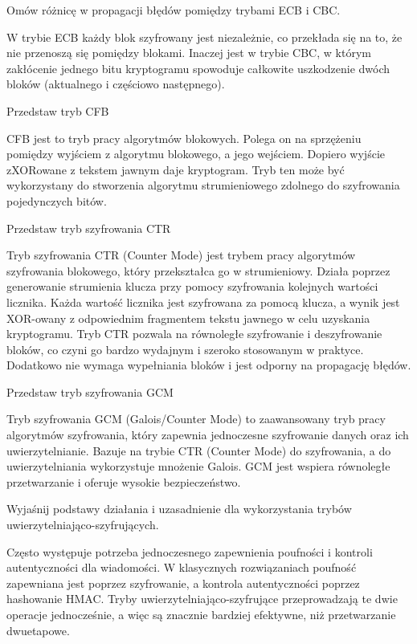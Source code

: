 \documentclass[answers,11pt]{exam}
\begin{document}
\begin{questions}
\question Omów różnicę w propagacji błędów pomiędzy trybami ECB i CBC.
\begin{solution}
W trybie ECB każdy blok szyfrowany jest niezależnie, co przekłada się na to, że nie przenoszą się pomiędzy blokami. Inaczej jest w trybie CBC, w którym zakłócenie jednego bitu kryptogramu spowoduje całkowite uszkodzenie dwóch bloków (aktualnego i częściowo następnego). 
\end{solution}

\question Przedstaw tryb CFB
\begin{solution}
CFB jest to tryb pracy algorytmów blokowych. Polega on na sprzężeniu pomiędzy wyjściem z algorytmu blokowego, a jego wejściem. Dopiero wyjście zXORowane z tekstem jawnym daje kryptogram.
Tryb ten może być wykorzystany do stworzenia algorytmu strumieniowego zdolnego do szyfrowania pojedynczych bitów. 
\end{solution}

\question Przedstaw tryb szyfrowania CTR 
\begin{solution} 
Tryb szyfrowania CTR (Counter Mode) jest trybem pracy algorytmów szyfrowania blokowego, który przekształca go w strumieniowy. Działa poprzez generowanie strumienia klucza przy pomocy szyfrowania kolejnych wartości licznika. Każda wartość licznika jest szyfrowana za pomocą klucza, a wynik jest XOR-owany z odpowiednim fragmentem tekstu jawnego w celu uzyskania kryptogramu. Tryb CTR pozwala na równoległe szyfrowanie i deszyfrowanie bloków, co czyni go bardzo wydajnym i szeroko stosowanym w praktyce. Dodatkowo nie wymaga wypełniania bloków i jest odporny na propagację błędów.
\end{solution}

\question Przedstaw tryb szyfrowania GCM 
\begin{solution} 
Tryb szyfrowania GCM (Galois/Counter Mode) to zaawansowany tryb pracy algorytmów szyfrowania, który zapewnia jednoczesne szyfrowanie danych oraz ich uwierzytelnianie. Bazuje na trybie CTR (Counter Mode) do szyfrowania, a do uwierzytelniania wykorzystuje mnożenie Galois. 
GCM jest wspiera równoległe przetwarzanie i oferuje wysokie bezpieczeństwo.
\end{solution}


\question Wyjaśnij podstawy działania i uzasadnienie dla wykorzystania trybów uwierzytelniająco-szyfrujących.
\begin{solution}
Często występuje potrzeba jednoczesnego zapewnienia poufności i kontroli autentyczności dla wiadomości. W klasycznych rozwiązaniach poufność zapewniana jest poprzez szyfrowanie, a kontrola autentyczności poprzez hashowanie HMAC. Tryby uwierzytelniająco-szyfrujące przeprowadzają te dwie operacje jednocześnie, a więc są znacznie bardziej efektywne, niż przetwarzanie dwuetapowe.
\end{solution}



\end{questions}
\end{document}
